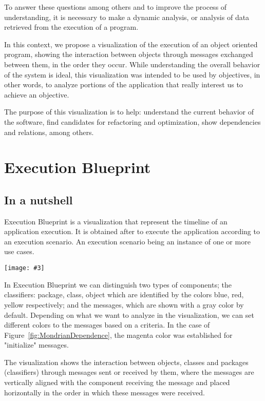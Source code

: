 \documentclass{sig-alternate}
\newcommand{\largefig}[4]{
	\begin{figure*}[#1]
		\centering
		\texttt{[image: \#3]}
		\caption{\label{fig:#3}#4}
	\end{figure*}}
\newcommand{\seclabel}[1]{\label{sec:#1}}
\newcommand{\figref}[1]{Figure~\ref{fig:#1}}
\begin{document}
To answer these questions among others and to improve the process of understanding, it is necessary to make a dynamic analysis, or analysis of data retrieved from the execution of a program.

In this context, we propose a visualization of the execution of an object oriented program, showing the interaction between objects through messages exchanged between them, in the order they occur. While understanding the overall behavior of the system is ideal, this visualization was intended to be used by objectives, in other words, to analyze portions of the application that really interest us to achieve an objective.

The purpose of this visualization is to help: understand the current behavior of the software, find candidates for refactoring and optimization, show dependencies and relations, among others.

\section{Execution Blueprint}\seclabel{executionBlueprint}

\subsection{In a nutshell}

Execution Blueprint is a visualization that represent the timeline of an application execution. It is obtained after to execute the application according to an execution scenario. An execution scenario being an instance of one or more use cases.

\largefig{}{1.0}{MondrianDependence}{How packages/class interact in the execution? (mondrian)}

In Execution Blueprint we can distinguish two types of components; the classifiers: package, class, object which are identified by the colors blue, red, yellow  respectively; and the messages, which are shown with a gray color by default. Depending on what we want to analyze in the visualization, we can set different colors to the messages based on a criteria. In the case of \figref{MondrianDependence}, the magenta color was established for "initialize" messages.

The visualization shows the interaction between objects, classes and packages (classifiers) through messages sent or received by them, where the messages are vertically aligned with the component receiving the message and placed horizontally in the order in which these messages were received.
\end{document}
